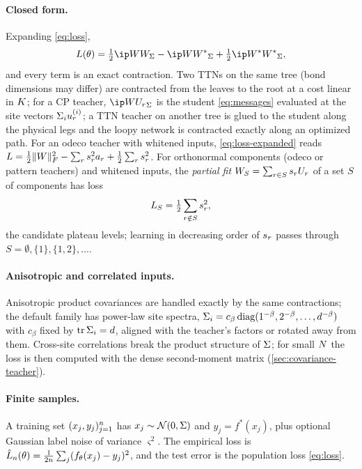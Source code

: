 \paragraph{Closed form.}
Expanding \eqref{eq:loss},
\begin{equation}\label{eq:loss-expanded}
  \Loss(\params)=\tfrac12\ipS{\W}{\W}-\ipS{\W}{\Wt}+\tfrac12\ipS{\Wt}{\Wt},
\end{equation}
and every term is an exact contraction. Two TTNs on the same tree (bond dimensions may differ) are
contracted from the leaves to the root at a cost linear in $K$; for a CP teacher,
$\ipS{\W}{\U{r}}$ is the student \eqref{eq:messages} evaluated at the site vectors
$\Sigma_{i}u_{r}^{(i)}$; a TTN teacher on another tree is glued to the student along the physical legs
and the loopy network is contracted exactly along an optimized path. For an odeco teacher with
whitened inputs, \eqref{eq:loss-expanded} reads
$L=\tfrac12\lVert W\rVert_{F}^2-\sum_rs_{r}^2a_{r}+\tfrac12\sum_rs_{r}^2$. For orthonormal components
(odeco or pattern teachers) and whitened inputs, the \emph{partial fit} $W_S=\sum_{r\in S}s_{r}U_{r}$
of a set $S$ of components has loss
\begin{equation}\label{eq:partial-fit}
  L_S=\tfrac12\sum_{r\notin S}s_{r}^2,
\end{equation}
the candidate plateau levels; learning in decreasing order of $s_{r}$ passes through
$S=\emptyset,\{1\},\{1,2\},\dots$.

\paragraph{Anisotropic and correlated inputs.}
Anisotropic product covariances are handled exactly by the same contractions; the default family has
power-law site spectra,
$\Sigma_{i}=c_\beta\operatorname{diag}(1^{-\beta},2^{-\beta},\dots,d^{-\beta})$ with $c_\beta$ fixed by
$\operatorname{tr}\Sigma_{i}=d$, aligned with the teacher's factors or rotated away from them. Cross-site
correlations break the product structure of $\Sigma$; for small $N$ the loss is then computed with
the dense second-moment matrix (\cref{sec:covariance-teacher}).

\paragraph{Finite samples.}
A training set $(x_j,y_j)_{j=1}^{n}$ has
$x_j\sim\mathcal{N}(0,\Sigma)$ \iid and $y_j=f^*(x_j)$, plus optional Gaussian label noise of variance
$\varsigma^2$. The empirical loss is
$\hat{L}_{n}(\theta)=\frac{1}{2n}\sum_{j}(f_\theta(x_j)-y_j)^2$, and the test error is the
population loss \eqref{eq:loss}.

